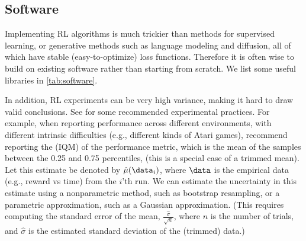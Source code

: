 \subsection{Software}

Implementing RL algorithms is much trickier than
methods for supervised learning,
or generative  methods such as language modeling
and diffusion,
all of which have stable (easy-to-optimize) loss functions.
Therefore it is often wise to build on existing
software rather than starting from scratch.
We list  some useful 
libraries  in \cref{tab:software}.

In addition, RL experiments can be very high variance,
making it hard to draw valid conclusions.
See \citep{Agarwal2021RL,Patterson2024,Jordan2024} for some recommended
experimental practices.
For example, when reporting performance across different environments,
with different intrinsic difficulties (e.g., different kinds
of Atari games),
\citep{Agarwal2021RL} recommend
reporting the  (IQM) of the performance metric,
which is the mean of the samples between the 0.25 and 0.75 percentiles,
(this is a special case of a trimmed mean).
Let this estimate be denoted by $\hat{\mu}(\data_i)$,
where $\data$ is the empirical data (e.g., reward vs time)
from the $i$'th run.
We can estimate the uncertainty in this estimate using
a nonparametric method, such as bootstrap resampling,
or a parametric approximation, such as
a Gaussian approximation. (This requires computing
the standard error of the mean, $\frac{\hat{\sigma}}{\sqrt{n}}$,
where $n$ is the number of trials,
and $\hat{\sigma}$ is the estimated  standard deviation
of the (trimmed) data.)


